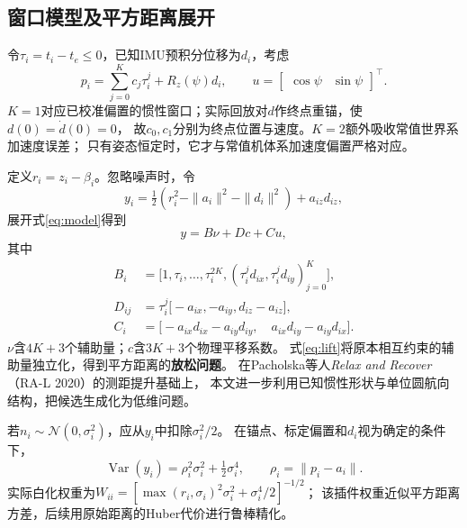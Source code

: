 \documentclass[11pt,a4paper]{ctexart}
\begin{document}
\subsection{窗口模型及平方距离展开}
令$\tau_i=t_i-t_e\leq0$，已知IMU预积分位移为$d_i$，考虑
\begin{equation}
 p_i=\sum_{j=0}^{K}c_j\tau_i^j+R_z(\psi)d_i,\qquad
 u=\begin{bmatrix}\cos\psi&\sin\psi\end{bmatrix}^{\top}.
 \label{eq:model}
\end{equation}
$K=1$对应已校准偏置的惯性窗口；实际回放对$d$作终点重锚，使$d(0)=\dot d(0)=0$，
故$c_0,c_1$分别为终点位置与速度。$K=2$额外吸收常值世界系加速度误差；
只有姿态恒定时，它才与常值机体系加速度偏置严格对应。

定义$r_i=z_i-\beta_i$。忽略噪声时，令
\begin{equation}
 y_i=\tfrac12(r_i^2-\|a_i\|^2-\|d_i\|^2)+a_{iz}d_{iz},
\end{equation}
展开式\eqref{eq:model}得到
\begin{equation}
 y=B\nu+Dc+Cu,
 \label{eq:lift}
\end{equation}
其中
\begin{align}
 B_i&=\big[1,\tau_i,\ldots,\tau_i^{2K},
       (\tau_i^jd_{ix},\tau_i^jd_{iy})_{j=0}^{K}\big],\\
 D_{ij}&=\tau_i^j\big[-a_{ix},-a_{iy},d_{iz}-a_{iz}\big],\\
 C_i&=\big[-a_{ix}d_{ix}-a_{iy}d_{iy},\quad
                 a_{ix}d_{iy}-a_{iy}d_{ix}\big].
\end{align}
$\nu$含$4K+3$个辅助量；$c$含$3K+3$个物理平移系数。
式\eqref{eq:lift}将原本相互约束的辅助量独立化，得到平方距离的\textbf{放松问题}。
在Pacholska等人\emph{Relax and Recover}（RA-L 2020）的测距提升基础上，
本文进一步利用已知惯性形状与单位圆航向结构，把候选生成化为低维问题。

若$n_i\sim\mathcal N(0,\sigma_i^2)$，应从$y_i$中扣除$\sigma_i^2/2$。
在锚点、标定偏置和$d_i$视为确定的条件下，
\begin{equation}
 \operatorname{Var}(y_i)=\rho_i^2\sigma_i^2+\tfrac12\sigma_i^4,
 \qquad \rho_i=\|p_i-a_i\|.
\end{equation}
实际白化权重为$W_{ii}=[\max(r_i,\sigma_i)^2\sigma_i^2+\sigma_i^4/2]^{-1/2}$；
该插件权重近似平方距离方差，后续用原始距离的Huber代价进行鲁棒精化。
\end{document}
